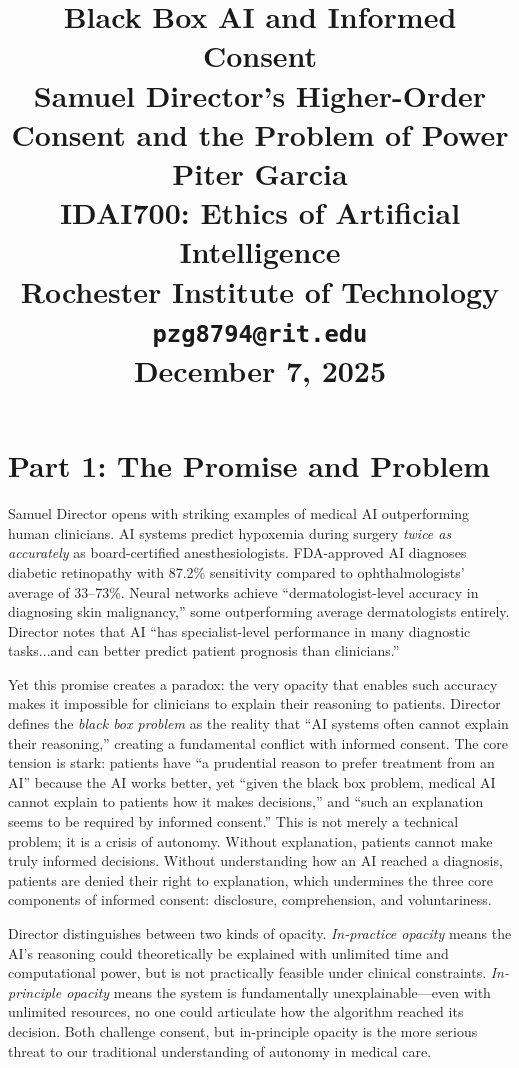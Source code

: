 \documentclass[12pt,twoside]{article}
\title{
\vspace*{1.5in}
\textbf{\Huge Black Box AI and Informed Consent}\\[1.5em]
\Large Samuel Director's Higher-Order Consent and the Problem of Power\\[3em]

\vfill
\Large \textbf{Piter Garcia}\\
\normalsize IDAI700: Ethics of Artificial Intelligence\\
Rochester Institute of Technology\\
\texttt{pzg8794@rit.edu}\\

\vfill
\normalsize \textbf{December 7, 2025}
}
\author{}
\date{}
\begin{document}
\thispagestyle{empty}
\maketitle
\newpage

\pagestyle{fancy}

\section*{Part 1: The Promise and Problem}

Samuel Director opens with striking examples of medical AI outperforming human clinicians. AI systems predict hypoxemia during surgery \textit{twice as accurately} as board-certified anesthesiologists. FDA-approved AI diagnoses diabetic retinopathy with 87.2\% sensitivity compared to ophthalmologists' average of 33--73\%. Neural networks achieve ``dermatologist-level accuracy in diagnosing skin malignancy,'' some outperforming average dermatologists entirely. Director notes that AI ``has specialist-level performance in many diagnostic tasks...and can better predict patient prognosis than clinicians.''

Yet this promise creates a paradox: the very opacity that enables such accuracy makes it impossible for clinicians to explain their reasoning to patients. Director defines the \textit{black box problem} as the reality that ``AI systems often cannot explain their reasoning,'' creating a fundamental conflict with informed consent. The core tension is stark: patients have ``a prudential reason to prefer treatment from an AI'' because the AI works better, yet ``given the black box problem, medical AI cannot explain to patients how it makes decisions,'' and ``such an explanation seems to be required by informed consent.'' This is not merely a technical problem; it is a crisis of autonomy. Without explanation, patients cannot make truly informed decisions. Without understanding how an AI reached a diagnosis, patients are denied their right to explanation, which undermines the three core components of informed consent: disclosure, comprehension, and voluntariness.

Director distinguishes between two kinds of opacity. \textit{In-practice opacity} means the AI's reasoning could theoretically be explained with unlimited time and computational power, but is not practically feasible under clinical constraints. \textit{In-principle opacity} means the system is fundamentally unexplainable---even with unlimited resources, no one could articulate how the algorithm reached its decision. Both challenge consent, but in-principle opacity is the more serious threat to our traditional understanding of autonomy in medical care.
\end{document}
